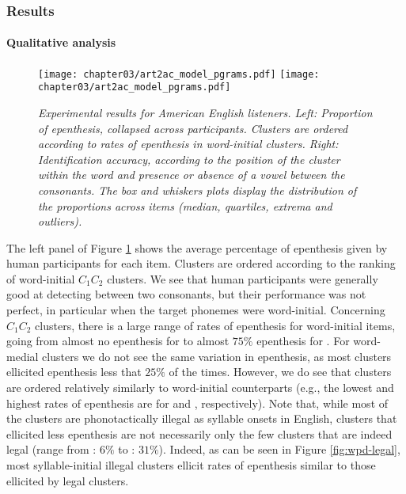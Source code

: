 {\subsubsection{Results}
  
\paragraph{Qualitative analysis}

\begin{figure}[htb!]
  \centering
    \texttt{[image: chapter03/art2ac\_model\_pgrams.pdf]}%
    \hspace{0.5cm}
    \texttt{[image: chapter03/art2ac\_model\_pgrams.pdf]}
    \caption{\textit{Experimental results for American English listeners.
      Left: Proportion of epenthesis, collapsed across participants. Clusters are ordered according to rates of epenthesis in word-initial clusters. 
      Right: Identification accuracy, according to the position of the cluster within the word and presence or absence of a vowel between the consonants. The box and whiskers plots display the distribution of the proportions across items (median, quartiles, extrema and outliers).}}
    \label{fig:wpd-hum}
  \end{figure}

The left panel of Figure \ref{fig:wpd-hum} shows the average percentage of epenthesis given by human participants for each item. Clusters are ordered according to the ranking of word-initial $C_{1}C_{2}$ clusters. We see that human participants were generally good at detecting \textipa{[@]} between two consonants, but their performance was not perfect, in particular when the target phonemes were word-initial. Concerning $C_{1}C_{2}$ clusters, there is a large range of rates of epenthesis for word-initial items, going from almost no epenthesis for  to almost $75\%$ epenthesis for . For word-medial clusters we do not see the same variation in epenthesis, as most clusters ellicited epenthesis less that $25\%$ of the times. However, we do see that clusters are ordered relatively similarly to word-initial counterparts (e.g., the lowest and highest rates of epenthesis are for  and , respectively). Note that, while most of the clusters are phonotactically illegal as syllable onsets in English, clusters that ellicited less epenthesis are not necessarily only the few clusters that are indeed legal (range from : $6\%$ to : $31\%$). Indeed, as can be seen in Figure \ref{fig:wpd-legal}, most syllable-initial illegal clusters ellicit rates of epenthesis similar to those ellicited by legal clusters. 

}

